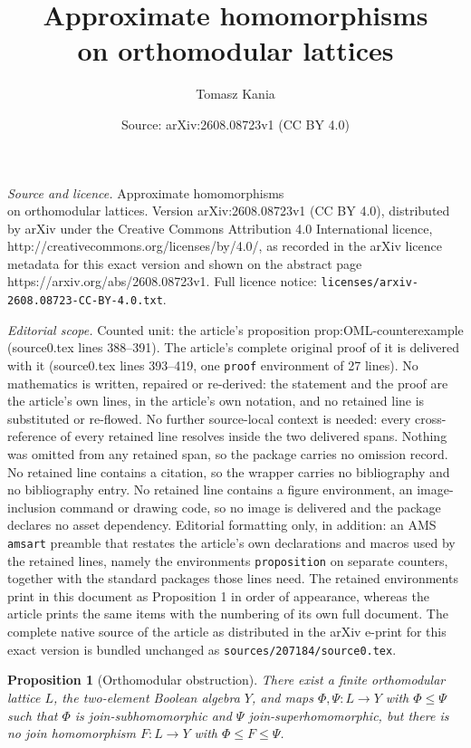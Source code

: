 \documentclass[10pt,a4paper]{amsart}
\title{Approximate homomorphisms\\ on orthomodular lattices}
\author{Tomasz Kania}
\date{Source: arXiv:2608.08723v1 (CC BY 4.0)}
\newtheorem{proposition}{Proposition}
\begin{document}
\maketitle

\noindent\emph{Source and licence.} Approximate homomorphisms\\ on orthomodular lattices. Version arXiv:2608.08723v1 (CC BY 4.0), distributed by arXiv under the Creative Commons Attribution 4.0 International licence, http://creativecommons.org/licenses/by/4.0/, as recorded in the arXiv licence metadata for this exact version and shown on the abstract page https://arxiv.org/abs/2608.08723v1. Full licence notice: \texttt{licenses/arxiv-2608.08723-CC-BY-4.0.txt}.\par\smallskip

\noindent\textit{Editorial scope.} Counted unit: the article's proposition prop:OML-counterexample (source0.tex lines 388--391). The article's complete original proof of it is delivered with it (source0.tex lines 393--419, one \texttt{proof} environment of 27 lines). No mathematics is written, repaired or re-derived: the statement and the proof are the article's own lines, in the article's own notation, and no retained line is substituted or re-flowed.  No further source-local context is needed: every cross-reference of every retained line resolves inside the two delivered spans.  Nothing was omitted from any retained span, so the package carries no omission record.  No retained line contains a citation, so the wrapper carries no bibliography and no bibliography entry.  No retained line contains a figure environment, an image-inclusion command or drawing code, so no image is delivered and the package declares no asset dependency.  Editorial formatting only, in addition: an AMS \texttt{amsart} preamble that restates the article's own declarations and macros used by the retained lines, namely the environments \texttt{proposition} on separate counters, together with the standard packages those lines need.  The retained environments print in this document as Proposition 1 in order of appearance, whereas the article prints the same items with the numbering of its own full document.  The complete native source of the article as distributed in the arXiv e-print for this exact version is bundled unchanged as \texttt{sources/207184/source0.tex}.
\begin{proposition}[Orthomodular obstruction]\label{prop:OML-counterexample}
There exist a finite orthomodular lattice $L$, the two-element Boolean algebra $Y$, and maps $\Phi,\Psi\colon L\to Y$ with $\Phi\le\Psi$
such that $\Phi$ is join-subhomomorphic and $\Psi$ join-superhomomorphic, but there is no join homomorphism $F\colon L\to Y$ with $\Phi\le F\le\Psi$.
\end{proposition}
\end{document}
